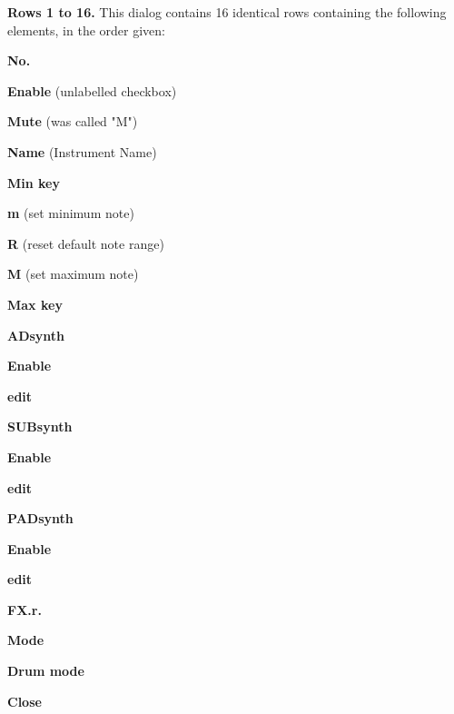    \begin{enumber}
      \item \textbf{Rows 1 to 16.}
         This dialog contains 16 identical rows containing the following
         elements, in the order given:
         \begin{enumber}
            \item \textbf{No.}
            \item \textbf{Enable} (unlabelled checkbox)
            \item \textbf{Mute} (was called "M")
            \item \textbf{Name} (Instrument Name)
            \item \textbf{Min key}
            \item \textbf{m} (set minimum note)
            \item \textbf{R} (reset default note range)
            \item \textbf{M} (set maximum note)
            \item \textbf{Max key}
            \item \textbf{ADsynth}
               \begin{enumber}
                  \item \textbf{Enable}
                  \item \textbf{edit}
               \end{enumber}
            \item \textbf{SUBsynth}
               \begin{enumber}
                  \item \textbf{Enable}
                  \item \textbf{edit}
               \end{enumber}
            \item \textbf{PADsynth}
               \begin{enumber}
                  \item \textbf{Enable}
                  \item \textbf{edit}
               \end{enumber}
            \item \textbf{FX.r.}
         \end{enumber}
      \item \textbf{Mode}
      \item \textbf{Drum mode}
      \item \textbf{Close}
   \end{enumber}


